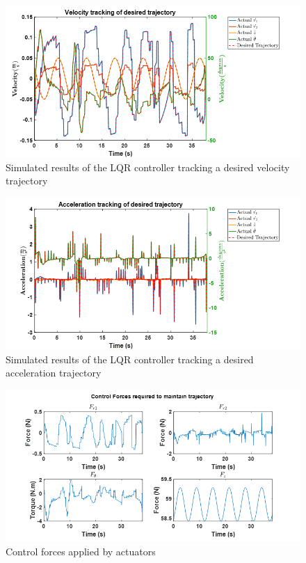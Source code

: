 \documentclass{UoNMCHA}
\numberwithin{equation}{section}
\begin{document}
	\begin{figure}[H]
		\begin{center}
			\includegraphics[width=.8\linewidth]{figs/Picture28}
			\caption{Simulated results of the LQR controller tracking a desired velocity trajectory}
			\label{figs/Picture28}
		\end{center}
	\end{figure}
	

	
	\begin{figure}[H]
		\begin{center}
			\includegraphics[width=.8\linewidth]{figs/Picture29}
			\caption{Simulated results of the LQR controller tracking a desired acceleration trajectory}
			\label{figs/Picture29}
		\end{center}
	\end{figure}
	
	

	
	\begin{figure}[H]
		\begin{center}
			\includegraphics[width=.8\linewidth]{figs/Picture30}
			\caption{Control forces applied by actuators}
			\label{figs/Picture30}
		\end{center}
	\end{figure}
	
\end{document}
